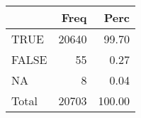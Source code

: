 
\begin{tabular}[t]{lrr}
\toprule
  & Freq & Perc\\
\midrule
TRUE & 20640 & 99.70\\
FALSE & 55 & 0.27\\
NA & 8 & 0.04\\
Total & 20703 & 100.00\\
\bottomrule
\end{tabular}